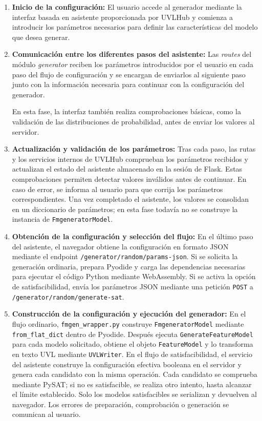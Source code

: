 \begin{enumerate}

    \item \textbf{Inicio de la configuración:} El usuario accede al generador
    mediante la interfaz basada en asistente proporcionada por UVLHub y
    comienza a introducir los parámetros necesarios para definir las
    características del modelo que desea generar.

    \item \textbf{Comunicación entre los diferentes pasos del asistente:}
    Las \textit{routes} del módulo \textit{generator} reciben los parámetros
    introducidos por el usuario en cada paso del flujo de configuración y se
    encargan de enviarlos al siguiente paso junto con la información necesaria
    para continuar con la configuración del generador.

    En esta fase, la interfaz también realiza comprobaciones básicas, como la
    validación de las distribuciones de probabilidad, antes de enviar los
    valores al servidor.

    \item \textbf{Actualización y validación de los parámetros:}
    Tras cada paso, las rutas y los servicios internos de UVLHub comprueban los
    parámetros recibidos y actualizan el estado del asistente almacenado en la
    sesión de Flask. Estas comprobaciones permiten detectar valores inválidos
    antes de continuar. En caso de error, se informa al usuario para que
    corrija los parámetros correspondientes. Una vez completado el asistente,
    los valores se consolidan en un diccionario de parámetros; en esta fase
    todavía no se construye la instancia de \texttt{FmgeneratorModel}.

    \item \textbf{Obtención de la configuración y selección del flujo:}
    En el último paso del asistente, el navegador obtiene la configuración en
    formato JSON mediante el endpoint
    \texttt{/generator/random/params-json}. Si se solicita la generación
    ordinaria, prepara Pyodide y carga las dependencias necesarias para
    ejecutar el código Python mediante WebAssembly. Si se activa la opción de
    satisfacibilidad, envía los parámetros JSON mediante una petición
    \texttt{POST} a \texttt{/generator/random/generate-sat}.

    \item \textbf{Construcción de la configuración y ejecución del generador:}
    En el flujo ordinario, \texttt{fmgen\_wrapper.py} construye
    \texttt{FmgeneratorModel} mediante \texttt{from\_flat\_dict} dentro de
    Pyodide. Después ejecuta \texttt{GenerateFeatureModel} para cada modelo
    solicitado, obtiene el objeto \texttt{FeatureModel} y lo transforma en
    texto UVL mediante \texttt{UVLWriter}. En el flujo de satisfacibilidad,
    el servicio del asistente construye la configuración efectiva booleana
    en el servidor y genera cada candidato con la misma operación. Cada
    candidato se comprueba mediante PySAT; si no es satisfacible, se realiza
    otro intento, hasta alcanzar el límite establecido. Solo los modelos
    satisfacibles se serializan y devuelven al navegador. Los errores de
    preparación, comprobación o generación se comunican al usuario.


\end{enumerate}
